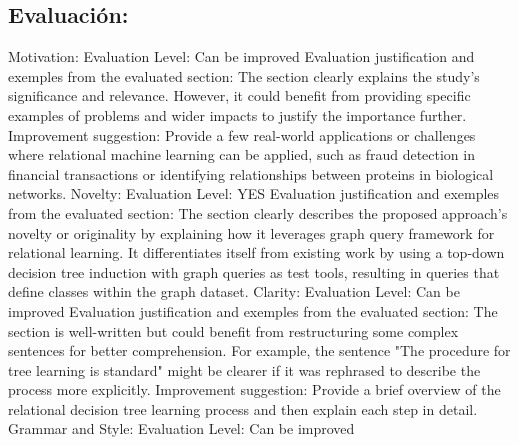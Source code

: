 \documentclass{article}%
\begin{document}
%
\subsection{Evaluación:}%
\label{subsec:Evaluacin}%
\newline%
Motivation:\newline%
Evaluation Level: Can be improved\newline%
Evaluation justification and exemples from the evaluated section: The section clearly explains the study's significance and relevance. However, it could benefit from providing specific examples of problems and wider impacts to justify the importance further.\newline%
Improvement suggestion: Provide a few real{-}world applications or challenges where relational machine learning can be applied, such as fraud detection in financial transactions or identifying relationships between proteins in biological networks.\newline%
\newline%
Novelty:\newline%
Evaluation Level: YES\newline%
Evaluation justification and exemples from the evaluated section: The section clearly describes the proposed approach's novelty or originality by explaining how it leverages graph query framework for relational learning. It differentiates itself from existing work by using a top{-}down decision tree induction with graph queries as test tools, resulting in queries that define classes within the graph dataset.\newline%
\newline%
Clarity:\newline%
Evaluation Level: Can be improved\newline%
Evaluation justification and exemples from the evaluated section: The section is well{-}written but could benefit from restructuring some complex sentences for better comprehension. For example, the sentence "The procedure for tree learning is standard" might be clearer if it was rephrased to describe the process more explicitly.\newline%
Improvement suggestion: Provide a brief overview of the relational decision tree learning process and then explain each step in detail.\newline%
\newline%
Grammar and Style:\newline%
Evaluation Level: Can be improved\newline%
\end{document}
